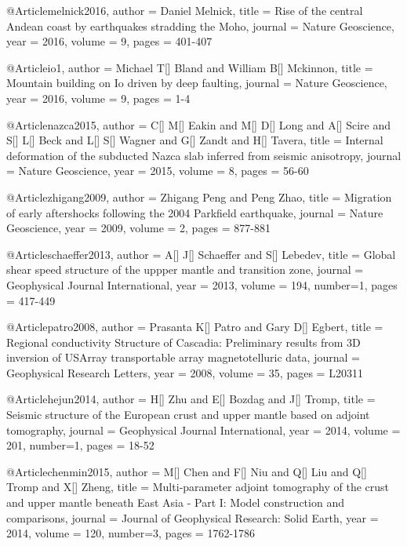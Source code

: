 @Article{melnick2016,
  author = 	 {Daniel Melnick},
  title = 	 {Rise of the central Andean coast by earthquakes stradding the Moho},
  journal = 	 {Nature Geoscience},
  year = 	 2016,
  volume = 9,
  pages =	 {401-407}
}

@Article{io1,
  author = 	 {Michael T[] Bland and William B[] Mckinnon},
  title = 	 {Mountain building on {I}o driven by deep faulting},
  journal = 	 {Nature Geoscience},
  year = 	 2016,
  volume = 9,
  pages =	 {1-4}
}

@Article{nazca2015,
  author = 	 {C[] M[] Eakin and M[] D[] Long and A[] Scire and S[] L[] Beck and L[] S[] Wagner and G[] Zandt and H[] Tavera},
  title = 	 {Internal deformation of the subducted Nazca slab inferred from seismic anisotropy},
  journal = 	 {Nature Geoscience},
  year = 	 2015,
  volume = 8,
  pages =	 {56-60}
}

@Article{zhigang2009,
  author = 	 {Zhigang Peng and Peng Zhao},
  title = 	 {Migration of early aftershocks following the 2004 Parkfield earthquake},
  journal = 	 {Nature Geoscience},
  year = 	 2009,
  volume = 2,
  pages =	 {877-881}
}

@Article{schaeffer2013,
  author = 	 {A[] J[] Schaeffer and S[] Lebedev},
  title = 	 {Global shear speed structure of the uppper mantle and transition zone},
  journal = 	 {Geophysical Journal International},
  year = 	 2013,
  volume = 194,
  number=1,
  pages =	 {417-449}
}

@Article{patro2008,
  author = 	 {Prasanta K[] Patro and Gary D[] Egbert},
  title = 	 {Regional conductivity Structure of Cascadia: Preliminary results from 3D inversion of USArray transportable array magnetotelluric data},
  journal = 	 {Geophysical Research Letters},
  year = 	 2008,
  volume = 35,
  pages =	 {L20311}
}

@Article{hejun2014,
  author = 	 {H[] Zhu and E[] Bozdag and J[] Tromp},
  title = 	 {Seismic structure of the European crust and upper mantle based on adjoint tomography},
  journal = 	 {Geophysical Journal International},
  year = 	 2014,
  volume = 201,
  number=1,
  pages =	 {18-52}
}

@Article{chenmin2015,
  author = 	 {M[] Chen and F[] Niu and Q[] Liu and Q[] Tromp and X[] Zheng},
  title = 	 {Multi‐parameter adjoint tomography of the crust and upper mantle beneath {E}ast {A}sia - {P}art I: {M}odel construction and comparisons},
  journal = 	 {Journal of Geophysical Research: Solid Earth},
  year = 	 2014,
  volume = 120,
  number=3,
  pages =	 {1762-1786}
}

